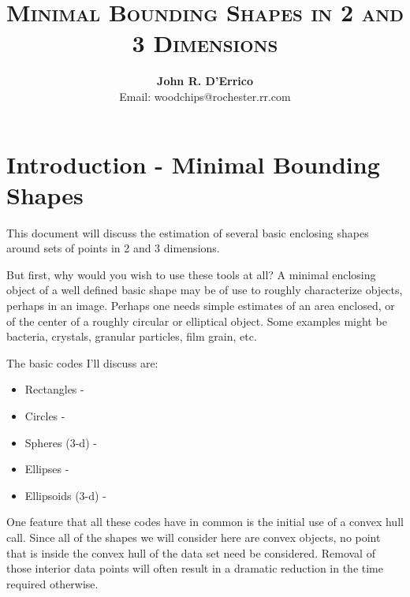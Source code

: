 \documentclass[a4paper,11pt]{article}
\begin{document}

\title{\textsc{Minimal Bounding Shapes in 2 and 3 Dimensions}}

\author{\textbf{John R. D'Errico}\\
Email: woodchips@rochester.rr.com}

\maketitle

\section{Introduction - Minimal Bounding Shapes}

This document will discuss the estimation of several basic enclosing shapes around
sets of points in 2 and 3 dimensions.

But first, why would you wish to use these tools at all? A minimal enclosing object of
a well defined basic shape may be of use to roughly characterize objects, perhaps in an 
image. Perhaps one needs simple estimates of an area enclosed, or of the center of a
roughly circular or elliptical object. Some examples might be bacteria, crystals, granular
particles, film grain, etc.

The basic codes I'll discuss are:

\begin{itemize}
  \item Rectangles - 
  \item Circles - 
  \item Spheres (3-d) - 
  \item Ellipses - 
  \item Ellipsoids (3-d) - 
\end{itemize}

One feature that all these codes have in common is the initial use of a convex
hull call. Since all of the shapes we will consider here are convex objects, no point that
is inside the convex hull of the data set need be considered. Removal of those interior
data points will often result in a dramatic reduction in the time required otherwise.
\end{document}
